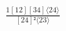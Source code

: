 \documentclass[varwidth, border=5pt]{standalone}
\begin{document}
\begin{my}
$\begin{gathered}
\scriptscriptstyle\frac{1[12][34]⟨24⟩}{[24]²⟨23⟩}
\end{gathered}$
\end{my}
\end{document}
